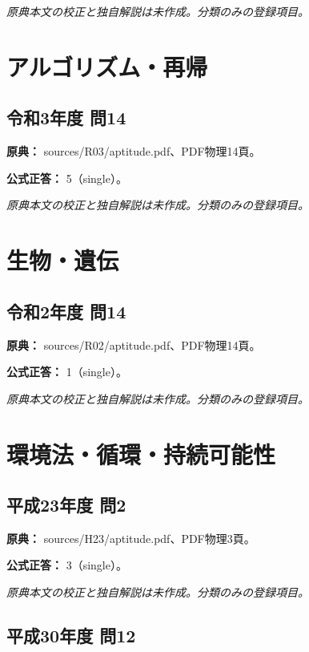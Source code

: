 \par\textit{原典本文の校正と独自解説は未作成。分類のみの登録項目。}

\section{アルゴリズム・再帰}

\subsection{令和3年度 問14}
\label{q:r03-reg-apt-14}

\noindent\textbf{原典：} sources/R03/aptitude.pdf、PDF物理14頁。

\textbf{公式正答：} 5（single）。

\par\textit{原典本文の校正と独自解説は未作成。分類のみの登録項目。}

\section{生物・遺伝}

\subsection{令和2年度 問14}
\label{q:r02-reg-apt-14}

\noindent\textbf{原典：} sources/R02/aptitude.pdf、PDF物理14頁。

\textbf{公式正答：} 1（single）。

\par\textit{原典本文の校正と独自解説は未作成。分類のみの登録項目。}

\section{環境法・循環・持続可能性}

\subsection{平成23年度 問2}
\label{q:h23-reg-apt-02}

\noindent\textbf{原典：} sources/H23/aptitude.pdf、PDF物理3頁。

\textbf{公式正答：} 3（single）。

\par\textit{原典本文の校正と独自解説は未作成。分類のみの登録項目。}

\subsection{平成30年度 問12}
\label{q:h30-reg-apt-12}

